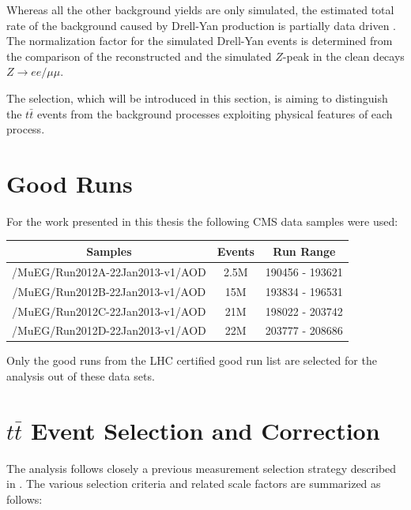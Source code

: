 Whereas all the other background yields are only simulated, the estimated total rate of the background caused by Drell-Yan production is 
partially data driven \cite{Chatrchyan:2011nb}. The normalization factor for the simulated Drell-Yan events is determined 
from the comparison of the reconstructed and the simulated $Z$-peak in the clean decays $Z \rightarrow ee/\mu\mu$. 

The selection, which will be introduced in this section, is aiming to distinguish the $t\bar{t}$ events
from the background processes exploiting physical features of each process.

\section{Good Runs}

For the work presented in this thesis the following CMS data samples were used:

\begin{center}\label{tab:samples}
  \begin{tabular}{| c c c |}
    \hline
    \textbf{Samples} & \textbf{Events} & \textbf{Run Range} \\ \hline
    /MuEG/Run2012A-22Jan2013-v1/AOD & 2.5M & 190456 - 193621 \\ 
    /MuEG/Run2012B-22Jan2013-v1/AOD & 15M & 193834 - 196531 \\
    /MuEG/Run2012C-22Jan2013-v1/AOD & 21M & 198022 - 203742 \\
    /MuEG/Run2012D-22Jan2013-v1/AOD & 22M & 203777 -  208686 \\
    \hline
  \end{tabular}
\end{center}

Only the good runs from the LHC certified good run list\cite{JSON} are selected for the analysis out of these data sets.

\section{$t\bar{t}$ Event Selection and Correction}\label{sec:sel}

The analysis follows closely a previous measurement selection strategy described in \cite{Asin2014Auth}. The various selection criteria and related scale factors are 
% 
% 
summarized as follows:

